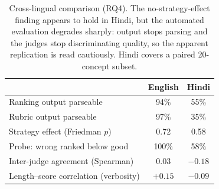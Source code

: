 \documentclass[11pt]{article}
\begin{document}
\begin{table}[t]
\centering
\caption{Cross-lingual comparison (RQ4). The no-strategy-effect finding appears to hold in Hindi,
but the automated evaluation degrades sharply: output stops parsing and the judges stop
discriminating quality, so the apparent replication is read cautiously. Hindi covers a paired
20-concept subset.}
\label{tab:hindi}
\small
\begin{tabular}{lcc}
\toprule
 & English & Hindi \\
\midrule
Ranking output parseable               & 94\% & 55\% \\
Rubric output parseable                & 97\% & 35\% \\
Strategy effect (Friedman $p$)         & 0.72 & 0.58 \\
Probe: wrong ranked below good         & 100\% & 58\% \\
Inter-judge agreement (Spearman)       & 0.03 & $-0.18$ \\
Length--score correlation (verbosity)  & $+0.15$ & $-0.09$ \\
\bottomrule
\end{tabular}
\end{table}
\end{document}
